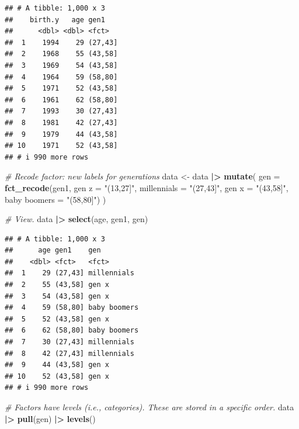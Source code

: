 \documentclass[
]{book}
\newenvironment{Shaded}{\begin{snugshade}}{\end{snugshade}}
\newcommand{\AttributeTok}[1]{\textcolor[rgb]{0.13,0.29,0.53}{#1}}
\newcommand{\CommentTok}[1]{\textcolor[rgb]{0.56,0.35,0.01}{\textit{#1}}}
\newcommand{\FunctionTok}[1]{\textcolor[rgb]{0.13,0.29,0.53}{\textbf{#1}}}
\newcommand{\NormalTok}[1]{#1}
\newcommand{\OtherTok}[1]{\textcolor[rgb]{0.56,0.35,0.01}{#1}}
\newcommand{\SpecialCharTok}[1]{\textcolor[rgb]{0.81,0.36,0.00}{\textbf{#1}}}
\newcommand{\StringTok}[1]{\textcolor[rgb]{0.31,0.60,0.02}{#1}}
\begin{document}
\begin{verbatim}
## # A tibble: 1,000 x 3
##    birth.y   age gen1   
##      <dbl> <dbl> <fct>  
##  1    1994    29 (27,43]
##  2    1968    55 (43,58]
##  3    1969    54 (43,58]
##  4    1964    59 (58,80]
##  5    1971    52 (43,58]
##  6    1961    62 (58,80]
##  7    1993    30 (27,43]
##  8    1981    42 (27,43]
##  9    1979    44 (43,58]
## 10    1971    52 (43,58]
## # i 990 more rows
\end{verbatim}

\begin{Shaded}
\begin{Highlighting}[]
\CommentTok{\# Recode factor: new labels for generations}
\NormalTok{data }\OtherTok{\textless{}{-}}\NormalTok{ data }\SpecialCharTok{|\textgreater{}} 
  \FunctionTok{mutate}\NormalTok{(}
    \AttributeTok{gen =} \FunctionTok{fct\_recode}\NormalTok{(gen1, }\StringTok{\textasciigrave{}}\AttributeTok{gen z}\StringTok{\textasciigrave{}} \OtherTok{=} \StringTok{"(13,27]"}\NormalTok{, }\StringTok{\textasciigrave{}}\AttributeTok{millennials}\StringTok{\textasciigrave{}} \OtherTok{=} \StringTok{"(27,43]"}\NormalTok{, }
                     \StringTok{\textasciigrave{}}\AttributeTok{gen x}\StringTok{\textasciigrave{}} \OtherTok{=} \StringTok{"(43,58]"}\NormalTok{, }\StringTok{\textasciigrave{}}\AttributeTok{baby boomers}\StringTok{\textasciigrave{}} \OtherTok{=} \StringTok{"(58,80]"}\NormalTok{)}
\NormalTok{  )}

\CommentTok{\# View.}
\NormalTok{data }\SpecialCharTok{|\textgreater{}} 
  \FunctionTok{select}\NormalTok{(age, gen1, gen)}
\end{Highlighting}
\end{Shaded}

\begin{verbatim}
## # A tibble: 1,000 x 3
##      age gen1    gen         
##    <dbl> <fct>   <fct>       
##  1    29 (27,43] millennials 
##  2    55 (43,58] gen x       
##  3    54 (43,58] gen x       
##  4    59 (58,80] baby boomers
##  5    52 (43,58] gen x       
##  6    62 (58,80] baby boomers
##  7    30 (27,43] millennials 
##  8    42 (27,43] millennials 
##  9    44 (43,58] gen x       
## 10    52 (43,58] gen x       
## # i 990 more rows
\end{verbatim}

\begin{Shaded}
\begin{Highlighting}[]
\CommentTok{\# Factors have levels (i.e., categories). These are stored in a specific order.}
\NormalTok{data }\SpecialCharTok{|\textgreater{}} 
  \FunctionTok{pull}\NormalTok{(gen) }\SpecialCharTok{|\textgreater{}} 
  \FunctionTok{levels}\NormalTok{()}
\end{Highlighting}
\end{Shaded}
\end{document}
